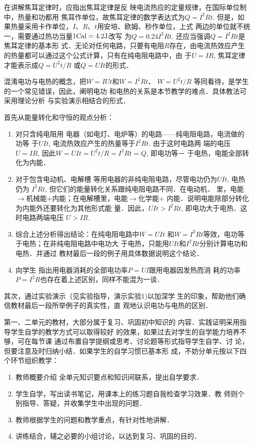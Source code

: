 在讲解焦耳定律时，应指出焦耳定律是反
映电流热应的定量规律，在国际单位制中，热量和功都用
焦耳作单位，故焦耳定律的数学表达式为$Q=I^2Rt$. 但是，如
果热量采用卡作单位，$I$、$R$、$t$用安培、欧姆、秒作单位，上式
两边的单位就不统一，需要通过热功当量$1{\rm Cal}=4.2{\rm J}$改写
为$Q=0.24I^2Rt$. 还应当强调$Q=I^2Rt$是焦耳定律的基本形
式．无论对任何电路，只要有电阻$R$存在，由电流热效应产生
的热量都可以通过这个公式计算，只有在纯电阻电路中，由
于$U=IR$, 焦耳定律才能表示成$Q=U^2t/R$
或$Q=UIt$的形式．

混淆电功与电热的概念，把$W=IUt$和$W=I^2Rt$、
$W=U^2t/R$
等同看待，是学生的一个常见错误，因此，阐明电功
和电热的关系是本节教学的难点．具体教法可采用理论分析
与实验演示相结合的形式．

首先从能量转化和守恒的观点分析：
\begin{enumerate}
\item 对只含纯电阻用
电器（如电灯、电炉等）的电路——纯电阻电路，电流做的功等
于$UIt$, 电流热效应产生的热量等于$I^2Rt$. 由于这时电路两
端的电压$U=IR$, 因此$W=UIt=U^2t/R=I^2Rt=Q$, 即电功等－
于电热，电能全部转化为内能．
\item 对于包含电动机、电解槽
等用电器的非纯电阻电路，尽管电功仍为$UIt$, 电热仍为
$I^2Rt$, 但它们的能量转化关系跟纯电阻电路不同．在电动机．
里，电能$\to $机械能$+$内能；在电解槽里，电能$\to $化学能$+$
内能．说明电能除部分转化为内能外还要转化为其他形式能
量．因此，$UIt>I^2Rt$, 即电功大于电热．这时电路两端电压
$U>IR$.
\item 综合上述分析得出结论：在纯电阻电路中$W=UIt$
和$W=I^2Rt$等效，电功等于电热；在非纯电阻电路中电功大
于电热，只能用$UIt$和$I^2Rt$分别计算电功和电热．并通过
教材最后一段的例子用具体数据说明这个结论．
\item 向学生
指出用电器消耗的全部电功率$P=UI$跟用电器因发热而消
耗的功率$P=I^2R$也存在着上述区别，同样不能混为一谈．
\end{enumerate}

其次，通过实验演示（见实验指导，演示实验1)以加深学
生的印象，帮助他们确信教材最后一段所举例子的真实性，直
观地认识电功与电热的区别．

第一、二单元的教材，大部分属于复习、巩固初中知识的
内容．实践证明采用指导学生自学的教学方式可以取得较好
的效果，如果过去对学生的自学能力培养不够，可在每节课
通过布置自学提纲或思考、讨论题等形式指导学生自学、讨
论，但要注意及时归纳小结．如果学生的自学习惯已基本形
成，不妨分单元按以下四个环节组织教学：
\begin{enumerate}
\item 教师概要介绍
全单元知识要点和知识间联系，提出自学要求．    
\item 学生自学，写出读书笔记，用课本上的练习题自我检查学习效果．教
师则个别指导、答疑，并收集学生中出现的问题．    
\item 教师根据学生的问题和教学重点，有针对性地讲解．    
\item 讲练结合，辅之必要的小组讨论，以达到复习、巩固的目的．
\end{enumerate}


